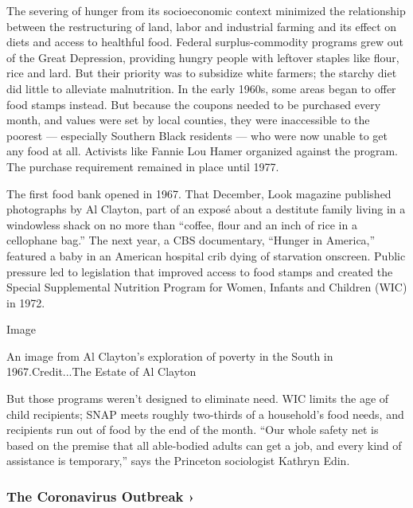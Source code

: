 The severing of hunger from its socioeconomic context minimized the
relationship between the restructuring of land, labor and industrial
farming and its effect on diets and access to healthful food. Federal
surplus-commodity programs grew out of the Great Depression, providing
hungry people with leftover staples like flour, rice and lard. But their
priority was to subsidize white farmers; the starchy diet did little to
alleviate malnutrition. In the early 1960s, some areas began to offer
food stamps instead. But because the coupons needed to be purchased
every month, and values were set by local counties, they were
inaccessible to the poorest --- especially Southern Black residents ---
who were now unable to get any food at all. Activists like Fannie Lou
Hamer organized against the program. The purchase requirement remained
in place until 1977.

The first food bank opened in 1967. That December, Look magazine
published photographs by Al Clayton, part of an exposé about a destitute
family living in a windowless shack on no more than ``coffee, flour and
an inch of rice in a cellophane bag.'' The next year, a CBS documentary,
``Hunger in America,'' featured a baby in an American hospital crib
dying of starvation onscreen. Public pressure led to legislation that
improved access to food stamps and created the Special Supplemental
Nutrition Program for Women, Infants and Children (WIC) in 1972.

Image

An image from Al Clayton's exploration of poverty in the South in
1967.Credit...The Estate of Al Clayton

But those programs weren't designed to eliminate need. WIC limits the
age of child recipients; SNAP meets roughly two-thirds of a household's
food needs, and recipients run out of food by the end of the month.
``Our whole safety net is based on the premise that all able-bodied
adults can get a job, and every kind of assistance is temporary,'' says
the Princeton sociologist Kathryn Edin.

\href{https://www.nytimes3xbfgragh.onion/news-event/coronavirus?action=click\&pgtype=Article\&state=default\&region=MAIN_CONTENT_3\&context=storylines_faq}{}

\hypertarget{the-coronavirus-outbreak-}{%
\subsubsection{The Coronavirus Outbreak
›}\label{the-coronavirus-outbreak-}}

